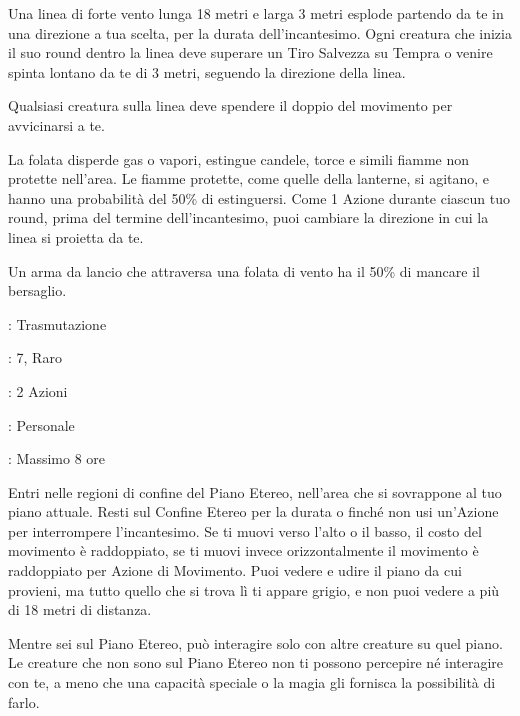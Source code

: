 \begin{multicols}{2}
Una linea di forte vento lunga 18 metri e larga 3 metri esplode partendo da te in una direzione a tua scelta, per la durata dell'incantesimo. Ogni creatura che inizia il suo round dentro la linea deve superare un Tiro Salvezza su Tempra o venire spinta lontano da te di 3 metri, seguendo la direzione della linea.

Qualsiasi creatura sulla linea deve spendere il doppio del movimento per avvicinarsi a te.

La folata disperde gas o vapori, estingue candele, torce e simili fiamme non protette nell'area. Le fiamme protette, come quelle della lanterne, si agitano, e hanno una probabilità del 50\% di estinguersi. Come 1 Azione durante ciascun tuo round, prima del termine dell'incantesimo, puoi cambiare la direzione in cui la linea si proietta da te.

Un arma da lancio che attraversa una folata di vento ha il 50\% di mancare il bersaglio.

\noindent\colorbox{OBSSgold!10}{
\begin{minipage}{0.95\linewidth}
\begin{description}[noitemsep, topsep=0pt, parsep=0pt, partopsep=0pt, leftmargin=0cm, labelwidth=1.3cm]
	\item[\textbf{Lista}]: Trasmutazione
	\item[\textbf{Livello}]: 7, Raro
	\item[\textbf{Lancio}]: 2 Azioni
	\item[\textbf{Gittata}]: Personale
	\item[\textbf{Durata}]: Massimo 8 ore
\end{description}
\end{minipage}}\smallskip

Entri nelle regioni di confine del Piano Etereo, nell'area che si sovrappone al tuo piano attuale. Resti sul Confine Etereo per la durata o finché non usi un'Azione per interrompere l'incantesimo. Se ti muovi verso l'alto o il basso, il costo del movimento è raddoppiato, se ti muovi invece orizzontalmente il movimento è raddoppiato per Azione di Movimento. Puoi vedere e udire il piano da cui provieni, ma tutto quello che si trova lì ti appare grigio, e non puoi vedere a più di 18 metri di distanza.

Mentre sei sul Piano Etereo, può interagire solo con altre creature su quel piano. Le creature che non sono sul Piano Etereo non ti possono percepire né interagire con te, a meno che una capacità speciale o la magia gli fornisca la possibilità di farlo.


\end{multicols}

